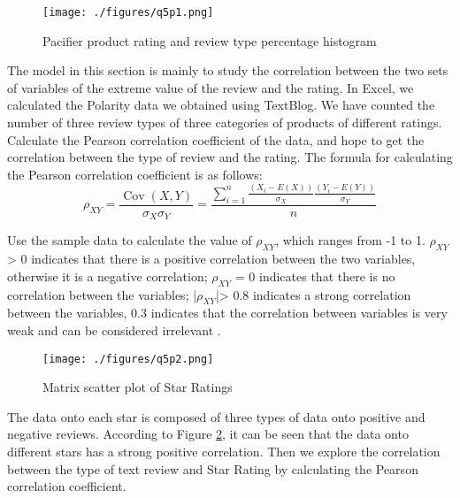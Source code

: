 \documentclass{mcmthesis}
\newcommand{\upcite}[1]{\textsuperscript{\textsuperscript{\cite{#1}}}}
\begin{document}
\begin{figure}[h]
	\centering
	\texttt{[image: ./figures/q5p1.png]}
	\caption{Pacifier product rating and review type percentage histogram} \label{q5p1}
\end{figure}

The model in this section is mainly to study the correlation between the two sets of variables of the extreme value of the review and the rating. In Excel, we calculated the Polarity data we obtained using TextBlog. We have counted the number of three review types of three categories of products of different ratings. Calculate the Pearson correlation coefficient of the data, and hope to get the correlation between the type of review and the rating. The formula for calculating the Pearson correlation coefficient is as follows:
\begin{equation}\rho_{X Y}=\frac{\operatorname{Cov}(X, Y)}{\sigma_{X} \sigma_{Y}}=\frac{\sum_{i=1}^{n} \frac{\left(X_{i}-E(X)\right)}{\sigma_{X}} \frac{\left(Y_{i}-E(Y)\right)}{\sigma_{Y}}}{n}
\end{equation}

Use the sample data to calculate the value of $\rho_{X Y}$, which ranges from -1 to 1. $\rho_{X Y}$> 0 indicates that there is a positive correlation between the two variables, otherwise it is a negative correlation; $\rho_{X Y}$ = 0 indicates that there is no correlation between the variables; |$\rho_{XY}$|> 0.8 indicates a strong correlation between the variables, 0.3 indicates that the correlation between variables is very weak and can be considered irrelevant \upcite{ww}.

\begin{figure}[h]
	\centering
	\texttt{[image: ./figures/q5p2.png]}
	\caption{Matrix scatter plot of Star Ratings} \label{q5p2}
\end{figure}

The data onto each star is composed of three types of data onto positive and negative reviews. According to Figure \ref{q5p2}, it can be seen that the data onto different stars has a strong positive correlation. Then we explore the correlation between the type of text review and Star Rating by calculating the Pearson correlation coefficient.
\end{document}

